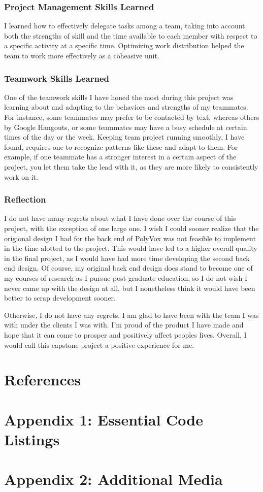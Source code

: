 \documentclass[onecolumn, draftclsnofoot,10pt, compsoc]{IEEEtran}
\begin{document}
\subsubsection{Project Management Skills Learned}

I learned how to effectively delegate tasks among a team, taking into account both the strengths of skill and the time available to each member with respect to a specific activity at a specific time. Optimizing work distribution helped the team to work more effectively as a coheasive unit.


\subsubsection{Teamwork Skills Learned}

One of the teamwork skills I have honed the most during this project was learning about and adapting to the behaviors and strengths of my teammates. For instance, some teammates may prefer to be contacted by text, whereas others by Google Hangouts, or some teammates may have a busy schedule at certain times of the day or the week. Keeping team project running smoothly, I have found, requires one to recognize patterns like these and adapt to them. For example, if one teammate has a stronger interest in a certain aspect of the project, you let them take the lead with it, as they are more likely to consistently work on it.


\subsubsection{Reflection}

I do not have many regrets about what I have done over the course of this project, with the exception of one large one. I wish I could sooner realize that the origional design I had for the back end of PolyVox was not feasible to implement in the time alotted to the project. This would have led to a higher overall quality in the final project, as I would have had more time developing the second back end design. Of course, my original back end design does stand to become one of my courses of research as I pursue post-graduate education, so I do not wish I never came up with the design at all, but I nonetheless think it would have been better to scrap development sooner.

Otherwise, I do not have any regrets. I am glad to have been with the team I was with under the clients I was with. I'm proud of the product I have made and hope that it can come to prosper and positively affect peoples lives. Overall, I would call this capstone project a positive experience for me.


\section{References}


\appendix

\section{Appendix 1: Essential Code Listings}

\section{Appendix 2: Additional Media}
\end{document}
